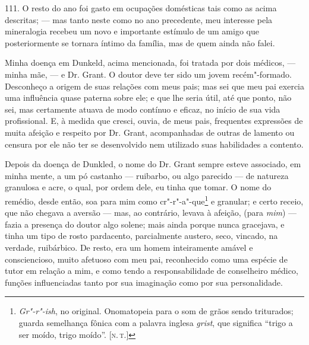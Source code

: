 111. O resto do ano foi gasto em ocupações domésticas tais como as acima
descritas; --- mas tanto neste como no ano precedente, meu interesse pela
mineralogia recebeu um novo e importante estímulo de um amigo que
posteriormente se tornara íntimo da família, mas de quem ainda não
falei.

Minha doença em Dunkeld, acima mencionada, foi tratada por dois médicos,
--- minha mãe, --- e Dr. Grant. O doutor deve ter sido um jovem
recém"-formado. Desconheço a origem de suas relações com meus pais; mas
sei que meu pai exercia uma influência quase paterna sobre ele; e que
lhe seria útil, até que ponto, não sei, mas certamente atuava de modo
contínuo e eficaz, no início de sua vida profissional. E, à medida que
cresci, ouvia, de meus pais, frequentes expressões de muita afeição e
respeito por Dr. Grant, acompanhadas de outras de lamento ou censura por
ele não ter se desenvolvido nem utilizado suas habilidades a contento.

Depois da doença de Dunkled, o nome do Dr. Grant sempre esteve
associado, em minha mente, a um pó castanho --- ruibarbo, ou algo
parecido --- de natureza granulosa e acre, o qual, por ordem dele, eu
tinha que tomar. O nome do remédio, desde então, soa para mim como
cr"-r"-a"-que\footnote{\emph{Gr"-r"-ish}, no original. Onomatopeia para o som
  de grãos sendo triturados; guarda semelhança fônica com a palavra
  inglesa \emph{grist}, que significa ``trigo a ser moído, trigo moído''.
  {[}\textsc{n.\,t.}{]}} e granular; e certo receio, que não chegava a aversão
--- mas, ao contrário, levava à afeição, (para \emph{mim}) --- fazia a
presença do doutor algo solene; mais ainda porque nunca gracejava, e
tinha um tipo de rosto pardacento, parcialmente austero, seco, vincado,
na verdade, ruibárbico. De resto, era um homem inteiramente amável e
consciencioso, muito afetuoso com meu pai, reconhecido como uma espécie
de tutor em relação a mim, e como tendo a responsabilidade de
conselheiro médico, funções influenciadas tanto por sua imaginação como
por sua personalidade.

